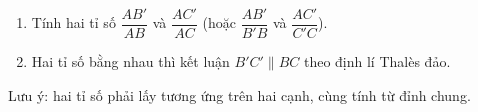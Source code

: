 \begin{enumerate}
\item Tính hai tỉ số $\dfrac{AB'}{AB}$ và $\dfrac{AC'}{AC}$ (hoặc $\dfrac{AB'}{B'B}$ và $\dfrac{AC'}{C'C}$).
\item Hai tỉ số bằng nhau thì kết luận $B'C'\parallel BC$ theo định lí Thalès đảo.
\end{enumerate}
Lưu ý: hai tỉ số phải lấy tương ứng trên hai cạnh, cùng tính từ đỉnh chung.
